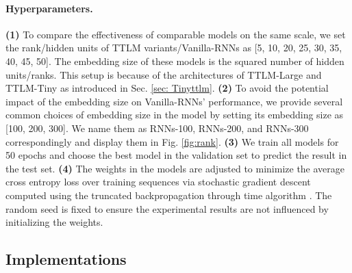 \documentclass{article}
\theoremstyle{plain}
\theoremstyle{definition}
\theoremstyle{remark}
\begin{document}





\paragraph{Hyperparameters.} \textbf{(1)} To compare the effectiveness of comparable models on the same scale, we set the rank/hidden units of TTLM variants/Vanilla-RNNs as [5, 10, 20, 25, 30, 35, 40, 45, 50]. The embedding size of these models is the squared number of hidden units/ranks. This setup is because of the architectures of TTLM-Large and TTLM-Tiny as introduced in Sec. \ref{sec: Tinyttlm}. \textbf{(2)}  To avoid the potential impact of the embedding size on Vanilla-RNNs' performance, we provide several common choices of embedding size in the model by setting its embedding size as [100, 200, 300]. We name them as RNNs-100, RNNs-200, and RNNs-300 correspondingly and display them in Fig. \ref{fig:rank}. \textbf{(3)}  We train all models for 50 epochs and choose the best model in the validation set to predict the result in the test set. \textbf{(4)}   The weights in the models are adjusted to minimize the average cross entropy loss over training sequences via stochastic gradient descent computed using the truncated backpropagation through time algorithm \citep{werbos1990backpropagation,williams1990efficient}.  The random seed is fixed to ensure the experimental results are not influenced by initializing the weights.

\subsection{Implementations}
\label{sec:implementations}
\end{document}
